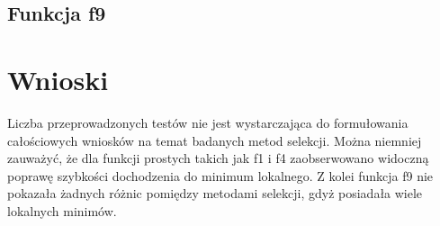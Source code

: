 \documentclass[11pt]{article}
\begin{document}
\subsection{Funkcja f9}

\section{Wnioski}
Liczba przeprowadzonych testów nie jest wystarczająca do formułowania całościowych wniosków na temat badanych metod selekcji.
Można niemniej zauważyć, że dla funkcji prostych takich jak f1 i f4 zaobserwowano widoczną poprawę szybkości dochodzenia do minimum lokalnego.
Z kolei funkcja f9 nie pokazała żadnych różnic pomiędzy metodami selekcji, gdyż posiadała wiele lokalnych minimów.
\end{document}
